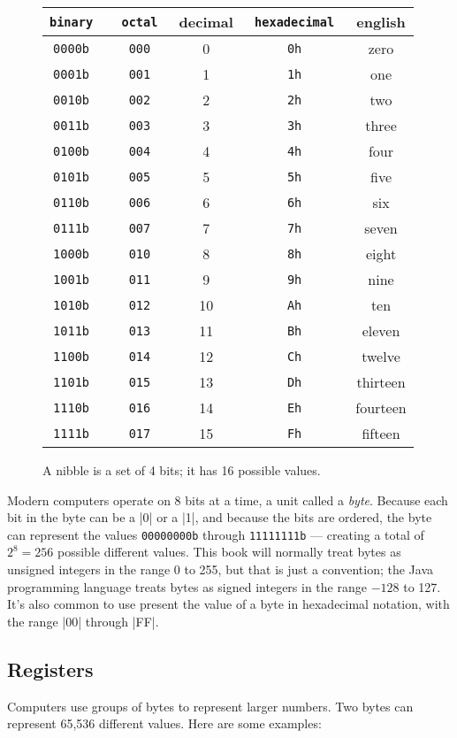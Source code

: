\begin{figure}
\begin{tabular}{>{\tt}c>{\tt}cc>{\tt}cc}
\textrm{binary} & \textrm{octal} & decimal & \textrm{hexadecimal} & english \\
\hline
0000b & 000 & 0 & 0h & zero \\
0001b & 001 & 1 & 1h & one \\
0010b & 002 & 2 & 2h & two \\
0011b & 003 & 3 & 3h & three \\
0100b & 004 & 4 & 4h & four \\
0101b & 005 & 5 & 5h & five \\
0110b & 006 & 6 & 6h & six \\
0111b & 007 & 7 & 7h & seven \\
1000b & 010 & 8 & 8h & eight \\
1001b & 011 & 9 & 9h & nine \\
1010b & 012 & 10& Ah & ten \\
1011b & 013 & 11& Bh & eleven \\
1100b & 014 & 12& Ch & twelve \\
1101b & 015 & 13& Dh & thirteen \\
1110b & 016 & 14& Eh & fourteen \\
1111b & 017 & 15& Fh & fifteen \\
\hline
\end{tabular}
\caption{A nibble is a set of 4 bits; it has 16 possible values.}\label{nibble}
\end{figure}

Modern computers operate on 8 bits at a time, a unit called a
\emph{byte}. Because each bit in the byte can be a |0| or a |1|, and
because the bits are ordered, the byte can represent the values
\texttt{00000000b} through \texttt{11111111b} --- creating a
total of $2^8=256$ possible different values. This book will normally treat
bytes as unsigned integers in the range 0 to 255, but that is just a
convention; the Java programming language treats bytes as signed
integers in the range $-128$ to 127. It's also common to use present
the value of a byte in hexadecimal notation, with the range |00|
through |FF|.

\subsection{Registers}

Computers use groups of bytes to represent larger numbers. Two bytes
can represent 65,536 different values. Here are some examples:

